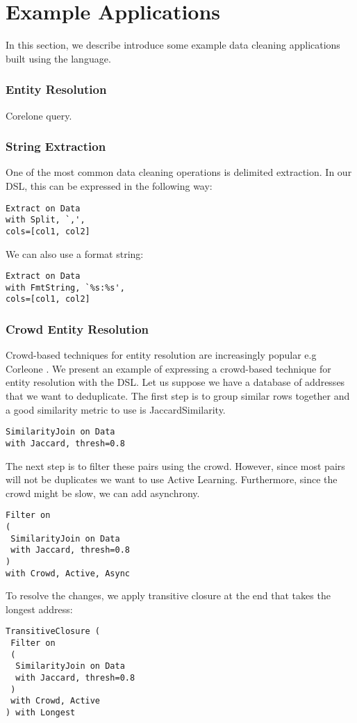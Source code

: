 \section{Example Applications} 
\label{s:apps}

In this section, we describe introduce some example data cleaning applications built using the \sys language.


\subsubsection{Entity Resolution}

Corelone query.


\subsubsection{String Extraction}
One of the most common data cleaning operations is delimited extraction.
In our DSL, this can be expressed in the following way:
\begin{lstlisting}
Extract on Data
with Split, `,',
cols=[col1, col2]
\end{lstlisting}

We can also use a format string:
\begin{lstlisting}
Extract on Data
with FmtString, `%s:%s',
cols=[col1, col2]
\end{lstlisting}

\subsubsection{Crowd Entity Resolution}
Crowd-based techniques for entity resolution are increasingly popular e.g Corleone \cite{DBLP:conf/sigmod/GokhaleDDNRSZ14}.
We present an example of expressing a crowd-based technique for entity resolution with the DSL.
Let us suppose we have a database of addresses that we want to deduplicate.
The first step is to group similar rows together and a good similarity metric to use is JaccardSimilarity.
\begin{lstlisting}
SimilarityJoin on Data
with Jaccard, thresh=0.8
\end{lstlisting}
The next step is to filter these pairs using the crowd. 
However, since most pairs will not be duplicates we want to use Active Learning.
Furthermore, since the crowd might be slow, we can add asynchrony.
\begin{lstlisting}
Filter on
( 
 SimilarityJoin on Data
 with Jaccard, thresh=0.8
)
with Crowd, Active, Async
\end{lstlisting}
To resolve the changes, we apply transitive closure at the end that takes the 
longest address:
\begin{lstlisting}
TransitiveClosure (
 Filter on
 ( 
  SimilarityJoin on Data
  with Jaccard, thresh=0.8
 )
 with Crowd, Active
) with Longest
\end{lstlisting}


